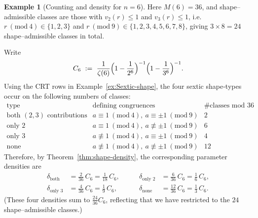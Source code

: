 \documentclass[12pt,a4paper,oneside]{amsart}
\theoremstyle{definition}
\newtheorem{example}[theorem]{Example}
\begin{document}
\begin{example}[Counting and density for $n=6$]\label{ex:count-n6}
Here $M(6)=36$, and shape--admissible classes are those with $v_2(r)\le 1$ and $v_3(r)\le 1$, i.e.\ $r\ (\mathrm{mod}\ 4)\in\{1,2,3\}$ and $r\ (\mathrm{mod}\ 9)\in\{1,2,3,4,5,6,7,8\}$, giving $3\times 8=24$ shape--admissible classes in total.

Write
\[
C_6\ :=\ \frac{1}{\zeta(6)}\Bigl(1-\frac1{2^6}\Bigr)^{-1}\Bigl(1-\frac1{3^6}\Bigr)^{-1}.
\]
Using the CRT rows in Example~\ref{ex:Sextic-shape}, the four sextic shape‑types occur on the following numbers of classes:
\[
\renewcommand{\arraystretch}{1.15}
\begin{array}{l|c|c}
\text{type} & \text{defining congruences} & \#\text{classes mod }36\\
\hline
\text{both }(2,3)\text{ contributions} & a\equiv 1\ (\mathrm{mod}\ 4),\ a\equiv \pm1\ (\mathrm{mod}\ 9) & 2\\
\text{only $2$} & a\equiv 1\ (\mathrm{mod}\ 4),\ a\not\equiv \pm1\ (\mathrm{mod}\ 9) & 6\\
\text{only $3$} & a\not\equiv 1\ (\mathrm{mod}\ 4),\ a\equiv \pm1\ (\mathrm{mod}\ 9) & 4\\
\text{none} & a\not\equiv 1\ (\mathrm{mod}\ 4),\ a\not\equiv \pm1\ (\mathrm{mod}\ 9) & 12
\end{array}
\]
Therefore, by Theorem~\ref{thm:shape-density}, the corresponding parameter densities are
\[
\begin{aligned}
\delta_{\text{both}}
&=\frac{2}{36}\,C_6=\frac{1}{18}\,C_6,
&\qquad
\delta_{\text{only }2}
&=\frac{6}{36}\,C_6=\frac{1}{6}\,C_6,\\
\delta_{\text{only }3}
&=\frac{4}{36}\,C_6=\frac{1}{9}\,C_6,
&\qquad
\delta_{\text{none}}
&=\frac{12}{36}\,C_6=\frac{1}{3}\,C_6.
\end{aligned}
\]
(These four densities sum to $\tfrac{24}{36}C_6$, reflecting that we have restricted to the $24$ shape--admissible classes.)
\end{example}


\end{document}
